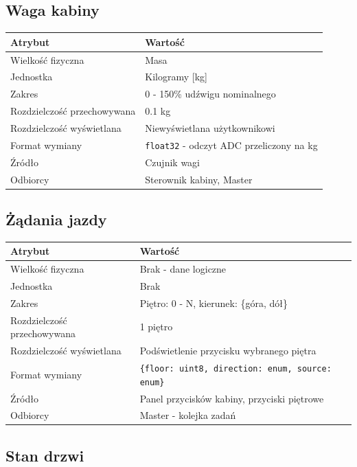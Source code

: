 \documentclass[a4paper,12pt]{article}
\begin{document}
\subsection{Waga kabiny}

\begin{tabularx}{\textwidth}{lX}
\toprule
\textbf{Atrybut} & \textbf{Wartość} \\
\midrule
Wielkość fizyczna & Masa \\
Jednostka & Kilogramy [kg] \\
Zakres & 0 - 150\% udźwigu nominalnego \\
Rozdzielczość przechowywana & 0.1 kg \\
Rozdzielczość wyświetlana & Niewyświetlana użytkownikowi \\
Format wymiany & \texttt{float32} - odczyt ADC przeliczony na kg \\
Źródło & Czujnik wagi \\
Odbiorcy & Sterownik kabiny, Master \\
\bottomrule
\end{tabularx}

\subsection{Żądania jazdy}

\begin{tabularx}{\textwidth}{lX}
\toprule
\textbf{Atrybut} & \textbf{Wartość} \\
\midrule
Wielkość fizyczna & Brak - dane logiczne \\
Jednostka & Brak \\
Zakres & Piętro: 0 - N, kierunek: \{góra, dół\} \\
Rozdzielczość przechowywana & 1 piętro \\
Rozdzielczość wyświetlana & Podświetlenie przycisku wybranego piętra \\
Format wymiany & \texttt{\{floor: uint8, direction: enum, source: enum\}} \\
Źródło & Panel przycisków kabiny, przyciski piętrowe \\
Odbiorcy & Master - kolejka zadań \\
\bottomrule
\end{tabularx}

\subsection{Stan drzwi}
\end{document}
